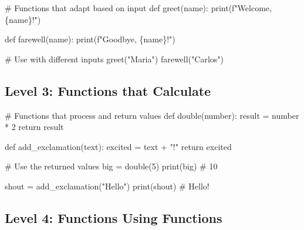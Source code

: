 \documentclass[
  letterpaper,
  DIV=11,
  numbers=noendperiod,
  oneside]{scrreprt}
\newenvironment{Shaded}{}{}
\newcommand{\BuiltInTok}[1]{\textcolor[rgb]{0.84,0.23,0.29}{#1}}
\newcommand{\CommentTok}[1]{\textcolor[rgb]{0.42,0.45,0.49}{#1}}
\newcommand{\ControlFlowTok}[1]{\textcolor[rgb]{0.84,0.23,0.29}{#1}}
\newcommand{\DecValTok}[1]{\textcolor[rgb]{0.00,0.36,0.77}{#1}}
\newcommand{\KeywordTok}[1]{\textcolor[rgb]{0.84,0.23,0.29}{#1}}
\newcommand{\NormalTok}[1]{\textcolor[rgb]{0.14,0.16,0.18}{#1}}
\newcommand{\OperatorTok}[1]{\textcolor[rgb]{0.14,0.16,0.18}{#1}}
\newcommand{\SpecialCharTok}[1]{\textcolor[rgb]{0.00,0.36,0.77}{#1}}
\newcommand{\SpecialStringTok}[1]{\textcolor[rgb]{0.01,0.18,0.38}{#1}}
\newcommand{\StringTok}[1]{\textcolor[rgb]{0.01,0.18,0.38}{#1}}
\begin{document}
\begin{Shaded}
\begin{Highlighting}[]
\CommentTok{\# Functions that adapt based on input}
\KeywordTok{def}\NormalTok{ greet(name):}
    \BuiltInTok{print}\NormalTok{(}\SpecialStringTok{f"Welcome, }\SpecialCharTok{\{}\NormalTok{name}\SpecialCharTok{\}}\SpecialStringTok{!"}\NormalTok{)}

\KeywordTok{def}\NormalTok{ farewell(name):}
    \BuiltInTok{print}\NormalTok{(}\SpecialStringTok{f"Goodbye, }\SpecialCharTok{\{}\NormalTok{name}\SpecialCharTok{\}}\SpecialStringTok{!"}\NormalTok{)}

\CommentTok{\# Use with different inputs}
\NormalTok{greet(}\StringTok{"Maria"}\NormalTok{)}
\NormalTok{farewell(}\StringTok{"Carlos"}\NormalTok{)}
\end{Highlighting}
\end{Shaded}

\subsection{Level 3: Functions that
Calculate}\label{level-3-functions-that-calculate}

\begin{Shaded}
\begin{Highlighting}[]
\CommentTok{\# Functions that process and return values}
\KeywordTok{def}\NormalTok{ double(number):}
\NormalTok{    result }\OperatorTok{=}\NormalTok{ number }\OperatorTok{*} \DecValTok{2}
    \ControlFlowTok{return}\NormalTok{ result}

\KeywordTok{def}\NormalTok{ add\_exclamation(text):}
\NormalTok{    excited }\OperatorTok{=}\NormalTok{ text }\OperatorTok{+} \StringTok{"!"}
    \ControlFlowTok{return}\NormalTok{ excited}

\CommentTok{\# Use the returned values}
\NormalTok{big }\OperatorTok{=}\NormalTok{ double(}\DecValTok{5}\NormalTok{)}
\BuiltInTok{print}\NormalTok{(big)  }\CommentTok{\# 10}

\NormalTok{shout }\OperatorTok{=}\NormalTok{ add\_exclamation(}\StringTok{"Hello"}\NormalTok{)}
\BuiltInTok{print}\NormalTok{(shout)  }\CommentTok{\# Hello!}
\end{Highlighting}
\end{Shaded}

\subsection{Level 4: Functions Using
Functions}\label{level-4-functions-using-functions}
\end{document}
